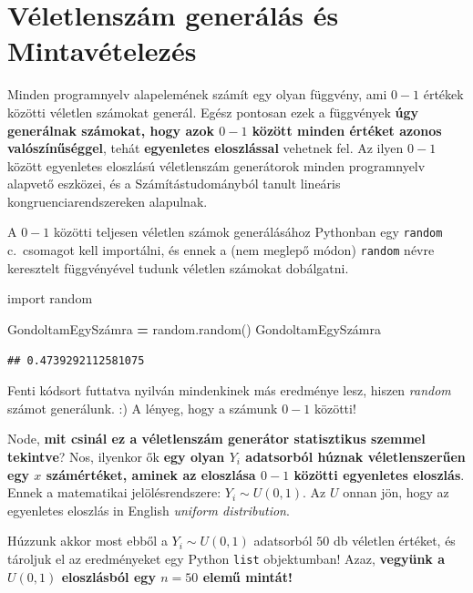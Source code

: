 \documentclass[
]{book}
\newenvironment{Shaded}{\begin{snugshade}}{\end{snugshade}}
\newcommand{\ImportTok}[1]{#1}
\newcommand{\NormalTok}[1]{#1}
\newcommand{\OperatorTok}[1]{\textcolor[rgb]{0.81,0.36,0.00}{\textbf{#1}}}
\begin{document}
\section{Véletlenszám generálás és Mintavételezés}\label{vuxe9letlenszuxe1m-generuxe1luxe1s-uxe9s-mintavuxe9telezuxe9s}

Minden programnyelv alapelemének számít egy olyan függvény, ami \(0-1\) értékek közötti véletlen számokat generál. Egész pontosan ezek a függvények \textbf{úgy generálnak számokat, hogy azok \(0-1\) között minden értéket azonos valószínűséggel}, tehát \textbf{egyenletes eloszlással} vehetnek fel.
Az ilyen \(0-1\) között egyenletes eloszlású véletlenszám generátorok minden programnyelv alapvető eszközei, és a Számítástudományból tanult lineáris kongruenciarendszereken alapulnak.

A \(0-1\) közötti teljesen véletlen számok generálásához Pythonban egy \texttt{random} c.~csomagot kell importálni, és ennek a (nem meglepő módon) \texttt{random} névre keresztelt függvényével tudunk véletlen számokat dobálgatni.

\begin{Shaded}
\begin{Highlighting}[]
\ImportTok{import}\NormalTok{ random}

\NormalTok{GondoltamEgySzámra }\OperatorTok{=}\NormalTok{ random.random()}
\NormalTok{GondoltamEgySzámra}
\end{Highlighting}
\end{Shaded}

\begin{verbatim}
## 0.4739292112581075
\end{verbatim}

Fenti kódsort futtatva nyilván mindenkinek más eredménye lesz, hiszen \emph{random} számot generálunk. :) A lényeg, hogy a számunk \(0-1\) közötti!

Node, \textbf{mit csinál ez a véletlenszám generátor statisztikus szemmel tekintve}? Nos, ilyenkor ők \textbf{egy olyan \(Y_i\) adatsorból húznak véletlenszerűen egy \(x\) számértéket, aminek az eloszlása \(0-1\) közötti egyenletes eloszlás}. Ennek a matematikai jelölésrendszere: \(Y_i \sim U(0,1)\). Az \(U\) onnan jön, hogy az egyenletes eloszlás in English \emph{uniform distribution}.

Húzzunk akkor most ebből a \(Y_i \sim U(0,1)\) adatsorból \(50\) db véletlen értéket, és tároljuk el az eredményeket egy Python \texttt{list} objektumban! Azaz, \textbf{vegyünk a \(U(0,1)\) eloszlásból egy \(n=50\) elemű mintát!}
\end{document}
